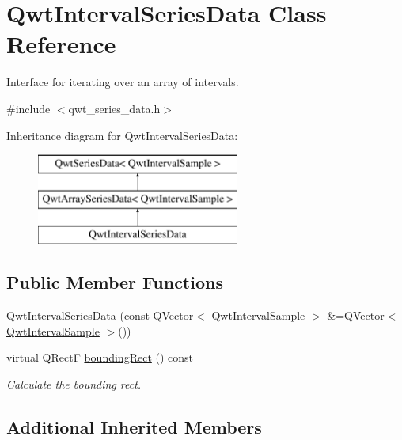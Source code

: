 \hypertarget{class_qwt_interval_series_data}{\section{Qwt\-Interval\-Series\-Data Class Reference}
\label{class_qwt_interval_series_data}
}


Interface for iterating over an array of intervals.  




{\ttfamily \#include $<$qwt\-\_\-series\-\_\-data.\-h$>$}

Inheritance diagram for Qwt\-Interval\-Series\-Data\-:\begin{figure}[H]
\begin{center}
\leavevmode
\includegraphics[height=3.000000cm]{class_qwt_interval_series_data}
\end{center}
\end{figure}
\subsection*{Public Member Functions}
\begin{DoxyCompactItemize}
\item 
\hyperlink{class_qwt_interval_series_data_ae85a2103d690c67f0e17aab94884bb79}{Qwt\-Interval\-Series\-Data} (const Q\-Vector$<$ \hyperlink{class_qwt_interval_sample}{Qwt\-Interval\-Sample} $>$ \&=Q\-Vector$<$ \hyperlink{class_qwt_interval_sample}{Qwt\-Interval\-Sample} $>$())
\item 
virtual Q\-Rect\-F \hyperlink{class_qwt_interval_series_data_afd9a41faed021eddcc1a9a36d15350d2}{bounding\-Rect} () const 
\begin{DoxyCompactList}\small\item\em Calculate the bounding rect. \end{DoxyCompactList}\end{DoxyCompactItemize}
\subsection*{Additional Inherited Members}


